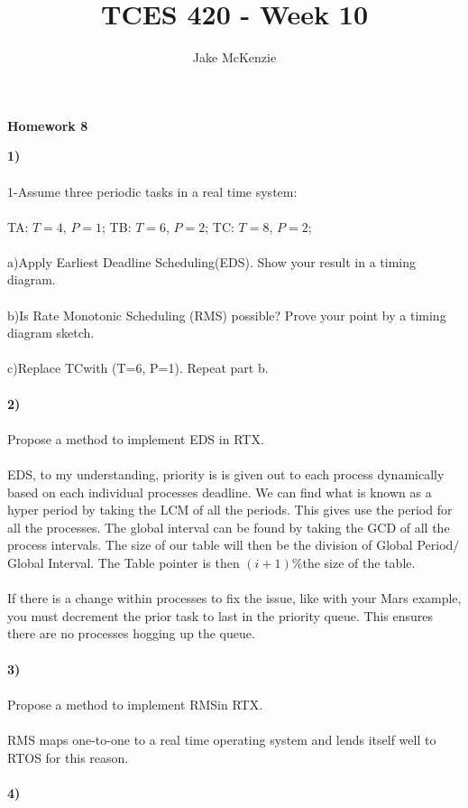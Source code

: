 \documentclass[12pt]{article}
\begin{document}
\title{TCES 420 - Week 10}
\author{Jake McKenzie}
\maketitle
\noindent\centerline{\textbf{Homework 8}}
\textbf{1)}\\\\
1-Assume three periodic tasks in a real time system:\\\\
TA: $T=4$, $P=1$;
TB: $T=6$, $P=2$;
TC: $T=8$, $P=2$;\\\\
a)Apply Earliest Deadline Scheduling(EDS). Show your result in a timing diagram.\\\\
b)Is Rate Monotonic Scheduling (RMS) possible? 
Prove your point by a timing diagram sketch.\\\\
c)Replace TCwith (T=6, P=1). Repeat part b.\\\\
\textbf{2)}\\\\
Propose a method to implement EDS in RTX.\\\\
EDS, to my understanding, priority is is given out to each process 
dynamically based on each individual processes deadline. We can find what 
is known as a hyper period by taking the LCM of all the periods. This gives 
use the period for all the processes. The global interval can be found by 
taking the GCD of all the process intervals. The size of our table will then 
be the division of Global Period$/$Global Interval. The 
Table pointer is then $(i+1)\%$the size of the table.\\\\
If there is a change within processes to fix the issue, like with your Mars example,
you must decrement the prior task to last in the priority queue. This ensures there 
are no processes hogging up the queue.\\\\
\textbf{3)}\\\\
Propose a method to implement RMSin RTX.\\\\
RMS maps one-to-one to a real time operating system and lends itself well 
to RTOS for this reason.\\\\
\textbf{4)}\\\\
\end{document}
